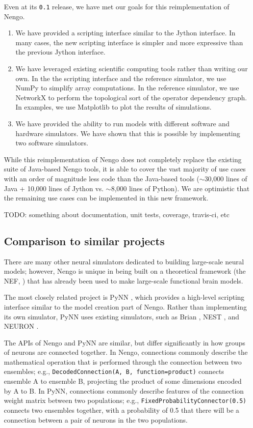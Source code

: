\documentclass{frontiersSCNS}
\begin{document}
Even at its \texttt{0.1} release,
we have met our goals
for this reimplementation of Nengo.
\begin{enumerate}
  \item We have provided a scripting interface
    similar to the Jython interface.
    In many cases, the new scripting interface
    is simpler and more expressive than
    the previous Jython interface.
  \item We have leveraged existing scientific computing tools
    rather than writing our own.
    In the the scripting interface and the reference simulator,
    we use NumPy to simplify array computations.
    In the reference simulator, we use
    NetworkX to perform the topological sort
    of the operator dependency graph.
    In examples, we use Matplotlib
    to plot the results of simulations.
  \item We have provided the ability to run models with
    different software and hardware simulators.
    We have shown that this is possible by
    implementing two software simulators.
\end{enumerate}

While this reimplementation of Nengo
does not completely replace
the existing suite of Java-based Nengo tools,
it is able to cover the vast majority of use cases
with an order of magnitude less
code than the Java-based tools
($\sim$30,000 lines of Java + 10,000 lines of Jython
vs. $\sim$8,000 lines of Python).
We are optimistic that the remaining use cases
can be implemented in this new framework.

TODO: something about documentation, unit tests,
coverage, travis-ci, etc

\subsection{Comparison to similar projects}

There are many other neural simulators
dedicated to building large-scale neural models;
however, Nengo is unique in being built
on a theoretical framework (the NEF, \cite{TODO})
that has already been used to make
large-scale functional brain models.

The most closely related project is PyNN
\cite{TODO},
which provides a high-level scripting
interface similar to the
model creation part of Nengo.
Rather than implementing its
own simulator, PyNN uses existing
simulators, such as Brian \cite{TODO},
NEST \cite{TODO}, and NEURON \cite{TODO}.

The APIs of Nengo and PyNN are similar,
but differ significantly
in how groups of neurons are connected together.
In Nengo, connections commonly describe
the mathematical operation that is performed
through the connection between
two ensembles;
e.g., \texttt{DecodedConnection(A, B,
function=product)} connects ensemble A
to ensemble B, projecting the product of
some dimensions encoded by A to B.
In PyNN, connections commonly describe
features of the connection weight matrix
between two populations;
e.g., \texttt{FixedProbabilityConnector(0.5)}
connects two ensembles together,
with a probability of 0.5
that there will be a connection
between a pair of neurons in the two populations.
\end{document}
